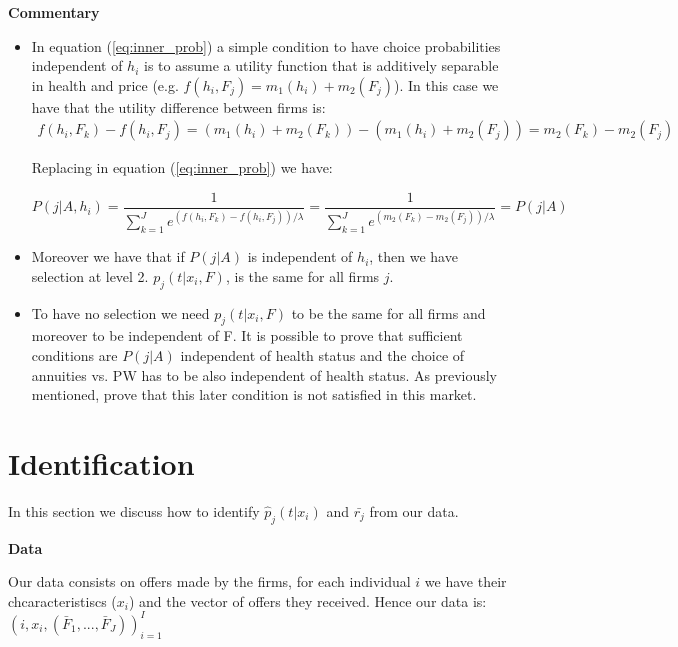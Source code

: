 \documentclass[12pt]{article}
\theoremstyle{plain}
\theoremstyle{plain}
\begin{document}
\textbf{Commentary}


\begin{itemize}
    \item In equation (\ref{eq:inner_prob}) a simple condition to have choice probabilities independent of $h_i$ is to assume a utility function that is additively separable in health and price (e.g. $f(h_i, F_j) = m_1(h_i) + m_2(F_j)$). In this case we have that the utility difference between firms is: 
    \begin{align*}
    f(h_i, F_k) - f(h_i, F_j) = ( m_1(h_i) + m_2(F_k)) - ( m_1(h_i) + m_2(F_j)) = m_2(F_k) - m_2(F_j)
    \end{align*}

    Replacing in equation (\ref{eq:inner_prob}) we have: 
    
    \begin{equation}\label{eq:inner_prob2}
    P(j|A, h_i) = \frac{1}{\sum_{k=1}^{J} e^{(f(h_i, F_k)-f(h_i, F_j)) / \lambda}} =  \frac{1}{\sum_{k=1}^{J} e^{(m_2(F_k) - m_2(F_j)) / \lambda}} = P(j|A)
    \end{equation}


    \item Moreover we have that if $P(j|A)$ is independent of $h_i$, then we have selection at level 2. $p_j(t|x_i, F)$, is the same for all firms $j$.

    \item To have no selection we need $p_j(t|x_i, F)$ to be the same for all firms and moreover to be independent of F. It is possible to prove that sufficient conditions are  $P(j|A)$ independent of health status and the choice of annuities vs. PW has to be also independent of health status. As previously mentioned, \textcite{illanes_retirement_2019} prove that this later condition is not satisfied in this market. 
\end{itemize}


\section{Identification}


In this section we discuss how to identify $\hat{p}_{j}(t|x_{i})$  and  $\bar{r_{j}}$ from our data. 


\textbf{Data}

Our data consists on offers made by the firms, for each individual $i$ we have their chcaracteristiscs ($x_i$) and the vector of offers they received. Hence our data is:  $(i, x_i, (\bar{F}_1, ..., \bar{F}_J))_{i=1}^I$ 
\end{document}
